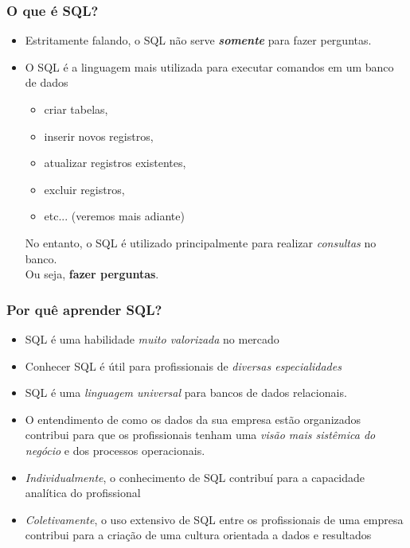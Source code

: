\documentclass[t, 10pt, aspectratio=169, table, x11names]{beamer}
\begin{document}
	\begin{frame}
		\frametitle{O que é SQL?}
		\vspace{0.3cm}
		\begin{itemize}
			\setlength{\itemsep}{8pt}
			\item Estritamente falando, o SQL não serve \textit{\textbf{somente}} para fazer perguntas. 
			\item O SQL é a linguagem mais utilizada para executar comandos em um banco de dados
			\vspace{0.11cm}
			\begin{itemize}
				\item criar tabelas,
				\item inserir novos registros,
				\item atualizar registros existentes,
				\item excluir registros,
				\item etc... (veremos mais adiante)
			\end{itemize}
			\vspace{0.5cm}
			\begin{center}
				No entanto, o SQL é utilizado principalmente para realizar \textit{consultas} no banco.\\
				Ou seja, \textbf{fazer perguntas}.
			\end{center}
		\end{itemize}
	\end{frame}

	\begin{frame}
		\frametitle{Por quê aprender SQL?}
		\vspace{2mm}
		\begin{itemize}[<+->]
			\setlength{\itemsep}{7pt}
			\item SQL é uma habilidade \textit{muito valorizada} no mercado
			\item Conhecer SQL é útil para profissionais de \textit{diversas especialidades}
			\item SQL é uma \textit{linguagem universal} para bancos de dados relacionais.
			\item O entendimento de como os dados da sua empresa estão organizados contribui para que os profissionais tenham uma \textit{visão mais sistêmica do negócio} e dos processos operacionais.
			\item \textit{Individualmente}, o conhecimento de SQL contribuí para a capacidade analítica do profissional
			\item \textit{Coletivamente}, o uso extensivo de SQL entre os profissionais de uma empresa contribui para a criação de uma cultura orientada a dados e resultados
		\end{itemize}
	\end{frame}
	
\end{document}
